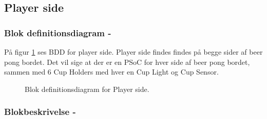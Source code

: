 \documentclass[Arkitektur/System_main.tex]{subfiles}
\begin{document}
\subsection{Player side} \label{sec:playerside_hardware}
\subsubsection{Blok definitionsdiagram - }

På figur \ref{fig:playerside_hardware_bdd} ses BDD for player side. Player side findes findes på begge sider af beer pong bordet. Det vil sige at der er en PSoC for hver side af beer pong bordet, sammen med 6 Cup Holders med hver en Cup Light og Cup Sensor.

\begin{figure}[H]
    \centering
    \caption{Blok definitionsdiagram for Player side.}
    \label{fig:playerside_hardware_bdd}
\end{figure}

\subsubsection{Blokbeskrivelse - }
\end{document}
